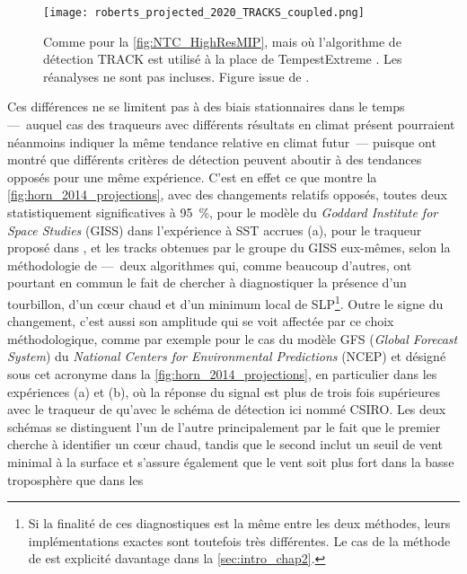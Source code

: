 \documentclass[../main.tex]{subfiles}
\begin{document}
\begin{figure}[htbp]
    \centering
    \texttt{[image: roberts\_projected\_2020\_TRACKS\_coupled.png]}
    \caption{Comme pour la \cref{fig:NTC_HighResMIP}, mais où l'algorithme de détection TRACK \parencite{hodges_how_2017} est utilisé à la place de
    TempestExtreme \parencite{ullrich_tempestextremes_2017,zarzycki_assessing_2017}. Les réanalyses ne sont pas incluses. Figure issue de
    \cite{roberts_projected_2020}.}
    \label{fig:NTC_HighResMIP_TRACK}
\end{figure}

Ces différences ne se limitent pas à des biais stationnaires dans le temps ---~auquel cas des traqueurs avec différents résultats en climat présent pourraient
néanmoins indiquer la même tendance relative en climat futur~--- puisque \cite{horn_tracking_2014} ont montré que différents critères de détection peuvent
aboutir à des tendances opposés pour une même expérience. C'est en effet ce que montre la \cref{fig:horn_2014_projections}, avec des changements relatifs
opposés, toutes deux statistiquement significatives à \SI{95}{\percent}, pour le modèle du \textit{Goddard Institute for Space Studies} (GISS) dans l'expérience
à SST accrues (a), pour le traqueur proposé dans \cite{zhao_simulations_2009}, et les tracks obtenues par le groupe du GISS eux-mêmes, selon la méthodologie de
\cite{camargo_improving_2002} ---~deux algorithmes qui, comme beaucoup d'autres, ont pourtant en commun le fait de chercher à diagnostiquer la présence d'un
tourbillon, d'un cœur chaud et d'un minimum local de SLP\footnote{Si la finalité de ces diagnostiques est la même entre les deux méthodes, leurs implémentations
exactes sont toutefois très différentes. Le cas de la méthode de \cite{camargo_improving_2002} est explicité davantage dans la \cref{sec:intro_chap2}.}. Outre
le signe du changement, c'est aussi son amplitude qui se voit affectée par ce choix méthodologique, comme par exemple pour le cas du modèle GFS (\textit{Global
Forecast System}) du \textit{National Centers for Environmental Predictions} (NCEP) et désigné sous cet acronyme dans la \cref{fig:horn_2014_projections}, en
particulier dans les expériences (a) et (b), où la réponse du signal est plus de trois fois supérieures avec le traqueur de \cite{zhao_simulations_2009} qu'avec
le schéma de détection ici nommé CSIRO. Les deux schémas se distinguent l'un de l'autre principalement par le fait que le premier cherche à identifier un cœur
chaud, tandis que le second inclut un seuil de vent minimal à la surface et s'assure également que le vent soit plus fort dans la basse troposphère que dans les
\end{document}
